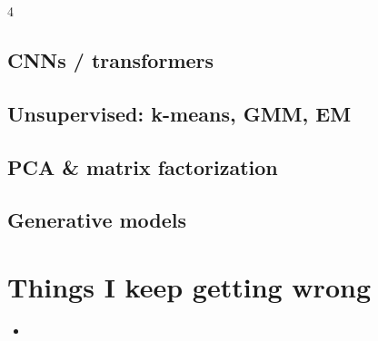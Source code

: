 \documentclass[a4paper,8pt,landscape]{extarticle}
\begin{document}
\begin{multicols*}{4}
\subsection*{CNNs / transformers}
\subsection*{Unsupervised: k-means, GMM, EM}
\subsection*{PCA \& matrix factorization}
\subsection*{Generative models}

\section*{Things I keep getting wrong}
\begin{itemize}
\item
\end{itemize}

\end{multicols*}
\end{document}
